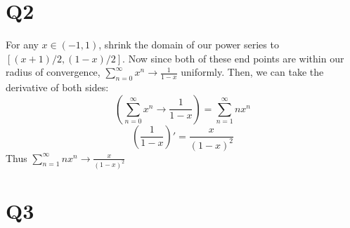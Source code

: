 \documentclass[12pt]{article}
\begin{document}
\section{Q2}
For any $x \in (-1,1)$, shrink the domain of our power series to $[(x+1)/2, (1-x)/2]$. Now since both of these end points are within our radius of convergence, $\sum_{n=0}^{\infty}x^n \to \frac{1}{1-x}$ uniformly.
\newline
Then, we can take the derivative of both sides:
$$(\sum_{n=0}^{\infty}x^n \to \frac{1}{1-x}) = \sum_{n=1}^{\infty}nx^n$$
$$(\frac{1}{1-x})' = \frac{x}{(1-x)^2}$$
Thus $\sum_{n=1}^{\infty}nx^n \to \frac{x}{(1-x)^2}$
\newpage


\section{Q3}
\end{document}
